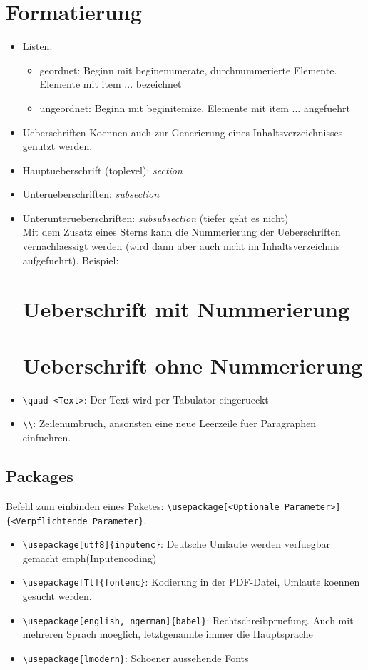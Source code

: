 \documentclass[11pt]{article}
\begin{document}
\section{Formatierung}
\begin{itemize}
  \item Listen: 
  \begin{itemize}
  \item geordnet: Beginn mit begin{enumerate}, durchnummerierte Elemente. Elemente mit item ... bezeichnet
  \item ungeordnet: Beginn mit begin{itemize}, Elemente mit item ... angefuehrt
\end{itemize}

\item Ueberschriften
Koennen auch zur Generierung eines Inhaltsverzeichnisses genutzt werden. 
  \item Hauptueberschrift (toplevel): \emph{section}
  \item Unterueberschriften: \emph{subsection}
  \item Unterunterueberschriften: \emph{subsubsection} (tiefer geht es nicht)
  \\Mit dem Zusatz eines Sterns kann die Nummerierung der Ueberschriften vernachlaessigt werden (wird dann aber auch nicht im Inhaltsverzeichnis aufgefuehrt).
  Beispiel: 
  \begin{verbatim*} 
\section{Ueberschrift mit Nummerierung}
\section*{Ueberschrift ohne Nummerierung}
  \end{verbatim*}

  \item \verb|\quad <Text>|: Der Text wird per Tabulator eingerueckt
  \item \verb|\\|: Zeilenumbruch, ansonsten eine neue Leerzeile fuer Paragraphen einfuehren.
\end{itemize}

\subsection{Packages}
Befehl zum einbinden eines Paketes: \verb|\usepackage[<Optionale Parameter>]{<Verpflichtende Parameter}|.
\begin{itemize}
  \item \verb|\usepackage[utf8]{inputenc}|: Deutsche Umlaute werden verfuegbar gemacht emph{(Inputencoding)}
  \item \verb|\usepackage[Tl]{fontenc}|: Kodierung in der PDF-Datei, Umlaute koennen gesucht werden. 
  \item \verb|\usepackage[english, ngerman]{babel}|: Rechtschreibpruefung. Auch mit mehreren Sprach moeglich, letztgenannte immer die Hauptsprache
  \item \verb|\usepackage{lmodern}|: Schoener aussehende Fonts
\end{itemize}
\end{document}
